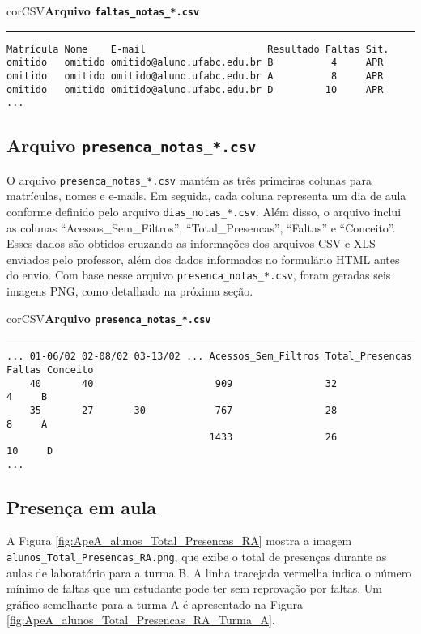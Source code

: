 \begin{myboxCode}{corCSV}{\textbf{Arquivo \texttt{faltas\_notas\_*.csv}}}\vspace{3mm}
\hrule
\begin{verbatim}
Matrícula Nome    E-mail                     Resultado Faltas Sit.
omitido   omitido omitido@aluno.ufabc.edu.br B          4     APR
omitido   omitido omitido@aluno.ufabc.edu.br A          8     APR
omitido   omitido omitido@aluno.ufabc.edu.br D         10     APR     
...
\end{verbatim}
\end{myboxCode}

\subsection{Arquivo \texttt{presenca\_notas\_*.csv}}

O arquivo \texttt{presenca\_notas\_*.csv} mantém as três primeiras colunas para matrículas, nomes e e-mails. Em seguida, cada coluna representa um dia de aula conforme definido pelo arquivo \texttt{dias\_notas\_*.csv}. Além disso, o arquivo inclui as colunas ``Acessos\_Sem\_Filtros'', ``Total\_Presencas'', ``Faltas'' e ``Conceito''. Esses dados são obtidos cruzando as informações dos arquivos CSV e XLS enviados pelo professor, além dos dados informados no formulário HTML antes do envio. Com base nesse arquivo \texttt{presenca\_notas\_*.csv}, foram geradas seis imagens PNG, como detalhado na próxima seção.

\begin{myboxCode}{corCSV}{\textbf{Arquivo \texttt{presenca\_notas\_*.csv}}}\vspace{3mm}
\hrule
\begin{verbatim}
... 01-06/02 02-08/02 03-13/02 ... Acessos_Sem_Filtros Total_Presencas Faltas Conceito
    40       40                     909                32               4     B
    35       27       30            767                28               8     A
                                   1433	               26              10     D
...
\end{verbatim}
\end{myboxCode}

\subsection{Presença em aula}

A Figura \ref{fig:ApeA_alunos_Total_Presencas_RA} mostra a imagem \verb|alunos_Total_Presencas_RA.png|, que exibe o total de presenças durante as aulas de laboratório para a turma B. A linha tracejada vermelha indica o número mínimo de faltas que um estudante pode ter sem reprovação por faltas. Um gráfico semelhante para a turma A é apresentado na Figura \ref{fig:ApeA_alunos_Total_Presencas_RA_Turma_A}.

